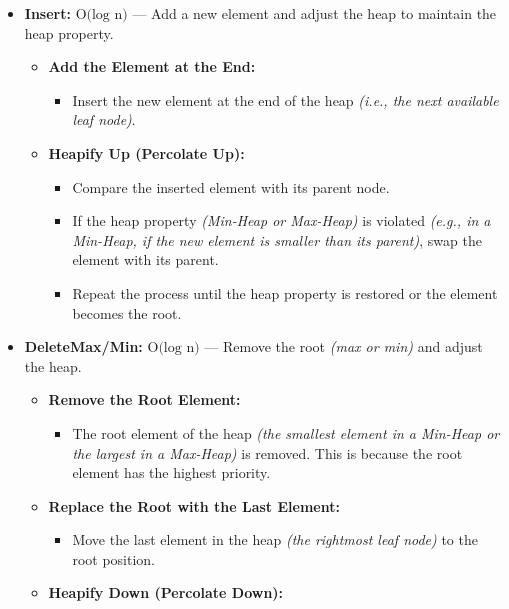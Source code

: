 \documentclass[
  letterpaper,
  DIV=11,
  numbers=noendperiod]{scrreprt}
\providecommand{\tightlist}{%
  \setlength{\itemsep}{0pt}\setlength{\parskip}{0pt}}
\begin{document}
\begin{itemize}
\tightlist
\item
  \textbf{Insert:} \(\text{O(log ⁡n)}\) --- Add a new element and adjust
  the heap to maintain the heap property.

  \begin{itemize}
  \tightlist
  \item
    \textbf{Add the Element at the End:}

    \begin{itemize}
    \tightlist
    \item
      Insert the new element at the end of the heap \emph{(i.e., the
      next available leaf node)}.
    \end{itemize}
  \item
    \textbf{Heapify Up (Percolate Up):}

    \begin{itemize}
    \tightlist
    \item
      Compare the inserted element with its parent node.
    \item
      If the heap property \emph{(Min-Heap or Max-Heap)} is violated
      \emph{(e.g., in a Min-Heap, if the new element is smaller than its
      parent)}, swap the element with its parent.
    \item
      Repeat the process until the heap property is restored or the
      element becomes the root.
    \end{itemize}
  \end{itemize}
\item
  \textbf{DeleteMax/Min:} \(\text{O(log ⁡n)}\) --- Remove the root
  \emph{(max or min)} and adjust the heap.

  \begin{itemize}
  \tightlist
  \item
    \textbf{Remove the Root Element:}

    \begin{itemize}
    \tightlist
    \item
      The root element of the heap \emph{(the smallest element in a
      Min-Heap or the largest in a Max-Heap)} is removed. This is
      because the root element has the highest priority.
    \end{itemize}
  \item
    \textbf{Replace the Root with the Last Element:}

    \begin{itemize}
    \tightlist
    \item
      Move the last element in the heap \emph{(the rightmost leaf node)}
      to the root position.
    \end{itemize}
  \item
    \textbf{Heapify Down (Percolate Down):}


\end{itemize}
\end{itemize}
\end{document}
